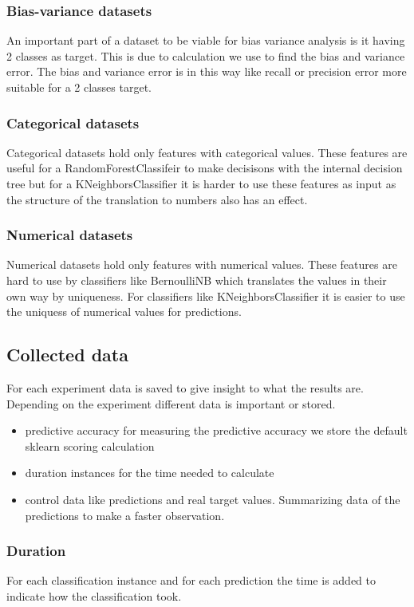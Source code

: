 \documentclass[a4paper,10pt]{article}
\begin{document}
\subsubsection{Bias-variance datasets}
An important part of a dataset to be viable for bias variance analysis is it having 2 classes as target. This is due to calculation we use to find the bias and variance error. The bias and variance error is in this way like recall or precision error more suitable for a 2 classes target.  %
\subsubsection{Categorical datasets}
Categorical datasets hold only features with categorical values. These features are useful for a RandomForestClassifeir to make decisisons with the internal decision tree but for a KNeighborsClassifier it is harder to use these features as input as the structure of the translation to numbers also has an effect.
\subsubsection{Numerical datasets}
Numerical datasets hold only features with numerical values. These features are hard to use by classifiers like BernoulliNB which translates the values in their own way by uniqueness. For classifiers like KNeighborsClassifier it is easier to use the uniquess of numerical values for predictions.

\subsection{Collected data}
For each experiment data is saved to give insight to what the results are. Depending on the experiment different data is important or stored. 
\begin{itemize}
	\item predictive accuracy for measuring the predictive accuracy we store the default sklearn scoring calculation
	\item duration instances for the time needed to calculate 
	\item control data like predictions and real target values. Summarizing data of the predictions to make a faster observation. 
\end{itemize}
\subsubsection{Duration}
For each classification instance and for each prediction the time is added to indicate how the classification took. 
\end{document}
